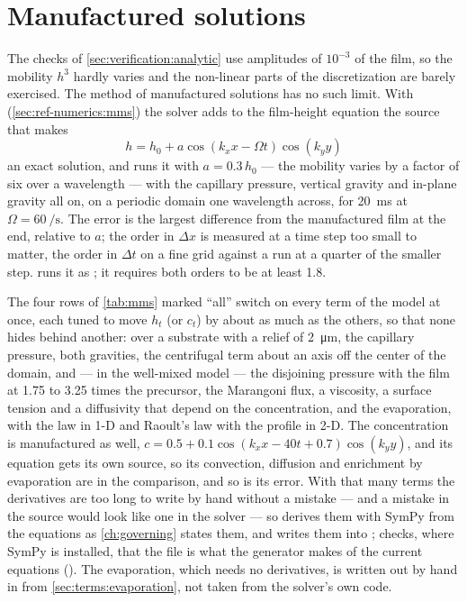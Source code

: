 \section{Manufactured solutions}
\label{sec:verification:mms}

The checks of \cref{sec:verification:analytic} use amplitudes of $10^{-3}$ of
the film, so the mobility $h^3$ hardly varies and the non-linear parts of the
discretization are barely exercised. The method of manufactured solutions has
no such limit. With 
(\cref{sec:ref-numerics:mms}) the solver adds to the film-height equation the
source that makes
\[
  h = h_0 + a\cos(k_x x - \Omega t)\cos(k_y y)
\]
an exact solution, and  runs it with $a = 0.3\,h_0$ --- the
mobility varies by a factor of six over a wavelength --- with the capillary
pressure, vertical gravity and in-plane gravity all on, on a periodic domain
one wavelength across, for \SI{20}{\milli\second} at $\Omega =
\SI{60}{\per\second}$. The error is the largest difference from the
manufactured film at the end, relative to $a$; the order in $\Delta x$ is
measured at a time step too small to matter, the order in $\Delta t$ on a fine
grid against a run at a quarter of the smaller step.  runs it as
; it requires both orders to be at least 1.8.

The four rows of \cref{tab:mms} marked ``all'' switch on every term of the
model at once, each tuned to move $h_t$ (or $c_t$) by about as much as the others, so
that none hides behind another: over a substrate with a relief of
\SI{2}{\micro\metre}, the capillary pressure, both gravities, the
centrifugal term about an axis off the center of the domain, and --- in the
well-mixed model --- the disjoining pressure with the film at 1.75 to 3.25
times the precursor, the Marangoni flux, a viscosity, a surface tension and a
diffusivity that depend on the concentration, and the evaporation, with the
 law in 1-D and Raoult's law with the  profile in
2-D. The concentration is manufactured as well,
$c = 0.5 + 0.1\cos(k_x x - 40t + 0.7)\cos(k_y y)$, and its equation gets its
own source, so its convection, diffusion and enrichment by evaporation are in
the comparison, and so is its error. With that many terms the derivatives
are too long to write by hand without a mistake --- and a mistake in the
source would look like one in the solver --- so 
derives them with SymPy from the equations as \cref{ch:governing} states
them, and writes them into ;
 checks, where SymPy is installed, that the file is what the
generator makes of the current equations (). The
evaporation, which needs no derivatives, is written out by hand in
 from \cref{sec:terms:evaporation}, not taken
from the solver's own code.

